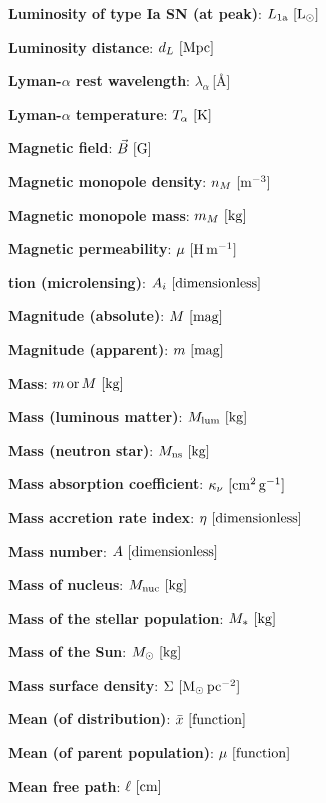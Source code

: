 \documentclass[a4paper,10pt]{article}
\begin{document}
{\noindent}\textbf{Luminosity of type Ia SN (at peak)}: $L_\mathrm{1a} ~ [{\rm L_\odot}]$

{\noindent}\textbf{Luminosity distance}: $d_L ~ [{\rm Mpc}]$

{\noindent}\textbf{Lyman-$\alpha$ rest wavelength}: $\lambda_\alpha$\,[\AA]

{\noindent}\textbf{Lyman-$\alpha$ temperature}: $T_\alpha ~ [{\rm K}]$

{\noindent}\textbf{Magnetic field}: $\vec{B} ~ [{\rm G}]$

{\noindent}\textbf{Magnetic monopole density}: $n_M ~ [{\rm m^{-3}}]$

{\noindent}\textbf{Magnetic monopole mass}: $m_M ~ [{\rm kg}]$

{\noindent}\textbf{Magnetic permeability}: $\mu ~ [{\rm H\,m^{-1}}]$

{\noindent}\textbf{tion (microlensing)}: $A_i ~ [{\rm dimensionless}]$

{\noindent}\textbf{Magnitude (absolute)}: $M ~ [{\rm mag}]$

{\noindent}\textbf{Magnitude (apparent)}: $m ~ [{\rm mag}]$

{\noindent}\textbf{Mass}: $m\,{\rm or}\,M ~ [{\rm kg}]$

{\noindent}\textbf{Mass (luminous matter)}: $M_{\rm lum} ~ [{\rm kg}]$

{\noindent}\textbf{Mass (neutron star)}: $M_{\rm ns} ~ [{\rm kg}]$

{\noindent}\textbf{Mass absorption coefficient}: $\kappa_\nu ~ [{\rm cm^2\,g^{-1}}]$

{\noindent}\textbf{Mass accretion rate index}: $\eta ~ [{\rm dimensionless}]$

{\noindent}\textbf{Mass number}: $A ~ [{\rm dimensionless}]$

{\noindent}\textbf{Mass of nucleus}: $M_{\rm nuc} ~ [{\rm kg}]$

{\noindent}\textbf{Mass of the stellar population}: $M_* ~ [{\rm kg}]$

{\noindent}\textbf{Mass of the Sun}: $M_\odot ~ [{\rm kg}]$

{\noindent}\textbf{Mass surface density}: $\Sigma ~ [{\rm M_\odot\,pc^{-2}}]$

{\noindent}\textbf{Mean (of distribution)}: $\bar{x} ~ [{\rm function}]$

{\noindent}\textbf{Mean (of parent population)}: $\mu ~ [{\rm function}]$

{\noindent}\textbf{Mean free path}: $\ell ~ [{\rm cm}]$
\end{document}

